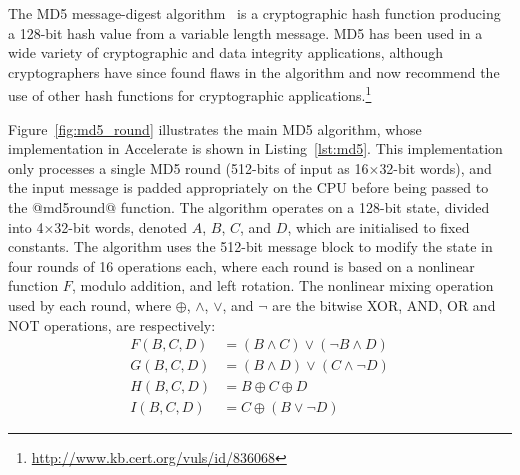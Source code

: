 The MD5 message-digest algorithm~\cite{Rivest:1992va} is a cryptographic hash
function producing a 128-bit hash value from a variable length message. MD5 has
been used in a wide variety of cryptographic and data integrity applications,
although cryptographers have since found flaws in the algorithm and now
recommend the use of other hash functions for cryptographic
applications.\footnote{\url{http://www.kb.cert.org/vuls/id/836068}}

Figure~\ref{fig:md5_round} illustrates the main MD5 algorithm, whose
implementation in Accelerate is shown in Listing~\ref{lst:md5}. This
implementation only processes a single MD5 round (512-bits of input as
16$\times$32-bit words), and the input message is padded appropriately on the
CPU before being passed to the @md5round@ function. The algorithm operates on a
128-bit state, divided into 4$\times$32-bit words, denoted $A$, $B$, $C$, and
$D$, which are initialised to fixed constants. The algorithm uses the 512-bit
message block to modify the state in four rounds of 16 operations each, where
each round is based on a nonlinear function $F$, modulo addition, and left
rotation. The nonlinear mixing operation used by each round, where $\oplus$,
$\wedge$, $\vee$, and $\neg$ are the bitwise XOR, AND, OR and NOT operations,
are respectively:
%
\begin{align*}
    F(B,C,D) &= (B \wedge C) \vee (\neg B \wedge D) \\
    G(B,C,D) &= (B \wedge D) \vee (C \wedge \neg D) \\
    H(B,C,D) &= B \oplus C \oplus D \\
    I(B,C,D) &= C \oplus (B \vee \neg D)
\end{align*}


